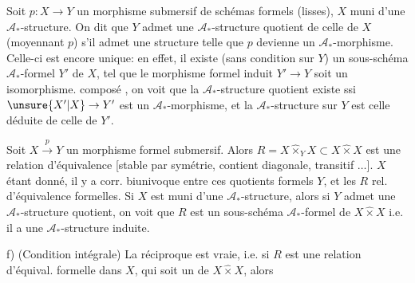 Soit $p:X\to Y$ un morphisme submersif de schémas formels (lisses),  $X$ muni d'une $\mathcal A_*$-structure. On dit que $Y$ admet une $\mathcal A_*$-structure quotient de celle de $X$ (moyennant $p$) s'il admet une  structure telle que $p$ devienne un $\mathcal A_*$-morphisme. Celle-ci est encore unique: en effet, il existe (sans condition sur $Y$) un  sous-schéma $\mathcal A_*$-formel $Y'$ de $X$, tel que le morphisme formel induit $Y'\to Y$ soit un isomorphisme.   composé
, on voit  que la $\mathcal A_*$-structure quotient existe ssi $\unsure{X'|X}\to Y'$ est un $\mathcal A_*$-morphisme, et la $\mathcal A_*$-structure sur $Y$ est celle déduite de celle de $Y'$.

 Soit $X\xrightarrow{p}Y$ un morphisme formel submersif. Alors $R=X\mathbin{\hat\times}_Y X\subset X\mathbin{\hat\times}X$ est une  relation d'équivalence [stable par symétrie, contient diagonale, transitif $\ldots$].   $X$ étant donné, il y a corr. biunivoque entre ces quotients formels $Y$, et les $R$ rel. d'équivalence formelles. Si $X$ est muni d'une $\mathcal A_*$-structure, alors si $Y$ admet une $\mathcal A_*$-structure quotient, on voit que $R$ est un sous-schéma $\mathcal A_*$-formel de $X\mathbin{\hat\times}X$ i.e. il a une $\mathcal A_*$-structure induite.

f) (Condition intégrale) La réciproque est vraie, i.e. si $R$ est une relation d'équival. formelle dans $X$, qui soit un  de $X\mathbin{\hat\times}X$, alors
